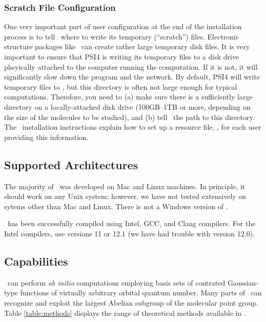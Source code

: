 \subsubsection{Scratch File Configuration}
One very important part of user configuration at the end of the
installation process is to tell \PSIfour\ where to write its temporary
(``scratch'') files.  Electronic structure packages like \PSIfour\ can
create rather large temporary disk files.  It is very important to 
ensure that PSI4 is writing its temporary files to a disk drive
phsyically attached to the computer running the computation.  If it
is not, it will significantly slow down the program and the network.
By default, PSI4 will write temporary files to , but this
directory is often not large enough for typical computations.  Therefore,
you need to (a) make sure there is a sufficiently large directory on a
locally-attached disk drive (100GB--1TB or more, depending on the size of
the molecules to be studied), and (b) tell \PSIfour\ the path to this
directory.  The \PSIfour\ installation instructions explain how to set up a
resource file, \psirc, for each user providing this information.


\subsection{Supported Architectures}
The majority of \PSIfour\ was developed on Mac and Linux machines.  In
principle, it should work on any Unix system; however, we have not tested
extensively on sytems other than Mac and Linux.  There is not a Windows
version of \PSIfour.

\PSIfour\ has been successfully compiled using Intel, GCC, and Clang
compilers.  For the Intel compilers, use versions 11 or
12.1 (we have had trouble with version 12.0).  


\subsection{Capabilities}

\PSIfour\ can perform {\em ab initio} computations employing basis
sets of contrated Gaussian-type functions of virtually arbitrary
orbital quantum number.  Many parts of \PSIfour\ can recognize and
exploit the largest Abelian subgroup of the molecular point group.
Table \ref{table:methods} displays the range of theoretical methods
available in \PSIfour.

